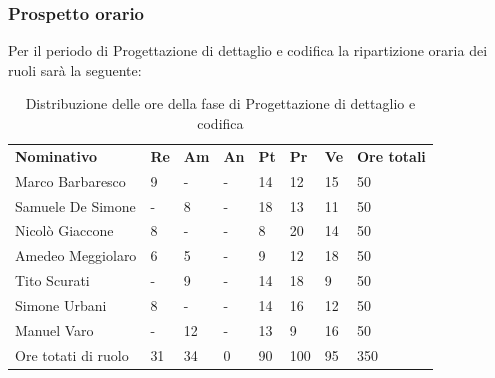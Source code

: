     \subsubsection{Prospetto orario}
    Per il periodo di Progettazione di dettaglio e codifica la ripartizione oraria dei ruoli sarà la seguente:
        \begin{center}
            \begin{table}[ht!]
                \centering
                \caption{Distribuzione delle ore della fase di Progettazione di dettaglio e codifica}
                \vspace{5px}
                \renewcommand{\arraystretch}{1.8}
                \begin{tabular}{p{100px} p{20px} p{20px} p{20px} p{20px} p{20px} p{20px} p{50px} }
                    \rowcolor{logo!70} \textbf{Nominativo} & \textbf{Re} & \textbf{Am} & \textbf{An} & \textbf{Pt} & \textbf{Pr} & \textbf{Ve} & \textbf{Ore totali}\\
                    Marco Barbaresco & 9 & - & - & 14 & 12 & 15 & 50\\
                    Samuele De Simone & - & 8 & - & 18 & 13 & 11 & 50\\
                    Nicolò Giaccone & 8 & - & - & 8 & 20 & 14 & 50\\
                    Amedeo Meggiolaro & 6 & 5 & - & 9 & 12 & 18 & 50\\
                    Tito Scurati & - & 9 & - & 14 & 18 & 9 & 50\\
                    Simone Urbani & 8 & - & - & 14 & 16 & 12 & 50\\
                    Manuel Varo & - & 12 & - & 13 & 9 & 16 & 50\\
                    Ore totati di ruolo & 31 & 34 & 0 & 90 & 100 & 95 & 350\\
                \end{tabular}
            \end{table}
        \end{center}
        \pagebreak
        
